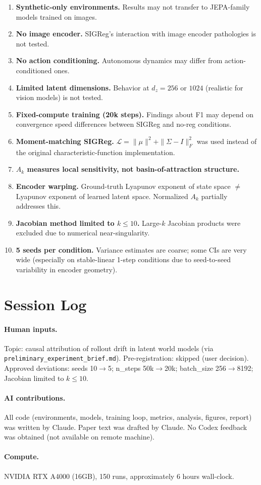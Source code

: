 \documentclass{article}
\begin{document}
\begin{enumerate}
\item \textbf{Synthetic-only environments.} Results may not transfer to JEPA-family models trained on images.
\item \textbf{No image encoder.} SIGReg's interaction with image encoder pathologies is not tested.
\item \textbf{No action conditioning.} Autonomous dynamics may differ from action-conditioned ones.
\item \textbf{Limited latent dimensions.} Behavior at $d_z = 256$ or $1024$ (realistic for vision models) is not tested.
\item \textbf{Fixed-compute training (20k steps).} Findings about F1 may depend on convergence speed differences between SIGReg and no-reg conditions.
\item \textbf{Moment-matching SIGReg.} $\mathcal{L} = \|\mu\|^2 + \|\Sigma - I\|_F^2$ was used instead of the original characteristic-function implementation.
\item \textbf{$A_k$ measures local sensitivity, not basin-of-attraction structure.}
\item \textbf{Encoder warping.} Ground-truth Lyapunov exponent of state space $\neq$ Lyapunov exponent of learned latent space. Normalized $A_k$ partially addresses this.
\item \textbf{Jacobian method limited to $k \leq 10$.} Large-$k$ Jacobian products were excluded due to numerical near-singularity.
\item \textbf{5 seeds per condition.} Variance estimates are coarse; some CIs are very wide (especially on stable-linear 1-step conditions due to seed-to-seed variability in encoder geometry).
\end{enumerate}

\section{Session Log}
\label{app:session}

\paragraph{Human inputs.}
Topic: causal attribution of rollout drift in latent world models (via \texttt{preliminary\_experiment\_brief.md}).
Pre-registration: skipped (user decision).
Approved deviations: seeds 10$\to$5; n\_steps 50k$\to$20k; batch\_size 256$\to$8192; Jacobian limited to $k \leq 10$.

\paragraph{AI contributions.}
All code (environments, models, training loop, metrics, analysis, figures, report) was written by Claude.
Paper text was drafted by Claude.
No Codex feedback was obtained (not available on remote machine).

\paragraph{Compute.}
NVIDIA RTX A4000 (16GB), 150 runs, approximately 6 hours wall-clock.
\end{document}
